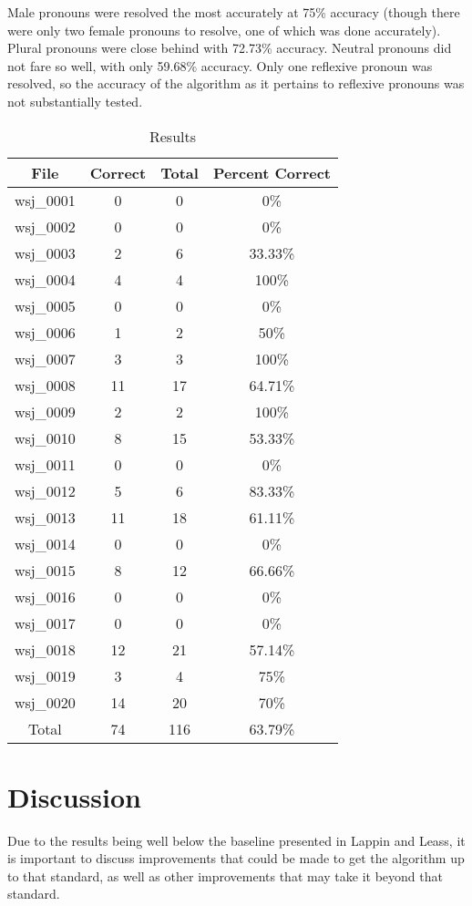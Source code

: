 \documentclass[11pt]{article}
\begin{document}
Male pronouns were resolved the most accurately at 75\% accuracy (though there were only two female pronouns to resolve, one of which was done accurately). Plural pronouns were close behind with 72.73\% accuracy. Neutral pronouns did not fare so well, with only 59.68\% accuracy. Only one reflexive pronoun was resolved, so the accuracy of the algorithm as it pertains to reflexive pronouns was not substantially tested.

\begin{table}[h]
\begin{center}
\begin{tabular}{|c|c|c|c|}
\hline \bf File & \bf Correct & \bf Total & \bf Percent Correct \\ \hline
wsj\_0001 & 0 & 0 & 0\%\\
wsj\_0002 & 0 & 0 & 0\%\\
wsj\_0003 & 2 & 6 & 33.33\%\\
wsj\_0004 & 4 & 4 & 100\%\\
wsj\_0005 & 0 & 0 & 0\%\\
wsj\_0006 & 1 & 2 & 50\%\\
wsj\_0007 & 3 & 3 & 100\%\\
wsj\_0008 & 11 & 17 & 64.71\%\\
wsj\_0009 & 2 & 2 & 100\%\\
wsj\_0010 & 8 & 15 & 53.33\%\\
wsj\_0011 & 0 & 0 & 0\%\\
wsj\_0012 & 5 & 6 & 83.33\%\\
wsj\_0013 & 11 & 18 & 61.11\%\\
wsj\_0014 & 0 & 0 & 0\%\\
wsj\_0015 & 8 & 12 & 66.66\%\\
wsj\_0016 & 0 & 0 & 0\%\\
wsj\_0017 & 0 & 0 & 0\%\\
wsj\_0018 & 12 & 21 & 57.14\%\\
wsj\_0019 & 3 & 4 & 75\%\\
wsj\_0020 & 14 & 20 & 70\%\\
Total & 74 & 116 & 63.79\%\\
\hline
\end{tabular}
\end{center}
\caption{\label{results-table} Results }
\end{table}

\section{Discussion}
Due to the results being well below the baseline presented in Lappin and Leass, it is important to discuss improvements that could be made to get the algorithm up to that standard, as well as other improvements that may take it beyond that standard.
\end{document}
